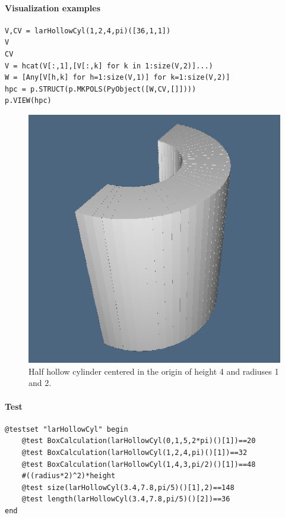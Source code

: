 \documentclass{article}
\begin{document}
\paragraph{Visualization examples}

\begin{verbatim}
V,CV = larHollowCyl(1,2,4,pi)([36,1,1])
V
CV
V = hcat(V[:,1],[V[:,k] for k in 1:size(V,2)]...)
W = [Any[V[h,k] for h=1:size(V,1)] for k=1:size(V,2)]
hpc = p.STRUCT(p.MKPOLS(PyObject([W,CV,[]])))
p.VIEW(hpc)
\end{verbatim}

\begin{figure}[htbp] 
\centering 
\includegraphics[scale=.39]{larHollowCyl.png} 
\caption{Half hollow cylinder centered in the origin of height 4 and radiuses 1 and 2.} 
\end{figure}

\paragraph{Test}
\begin{Verbatim}
@testset "larHollowCyl" begin
	@test BoxCalculation(larHollowCyl(0,1,5,2*pi)()[1])==20
	@test BoxCalculation(larHollowCyl(1,2,4,pi)()[1])==32
	@test BoxCalculation(larHollowCyl(1,4,3,pi/2)()[1])==48
	#((radius*2)^2)*height
	@test size(larHollowCyl(3.4,7.8,pi/5)()[1],2)==148
	@test length(larHollowCyl(3.4,7.8,pi/5)()[2])==36
end
\end{Verbatim}
\end{document}
